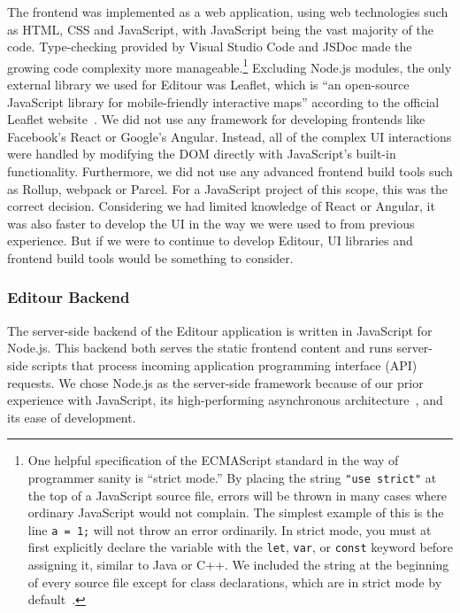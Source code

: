 \documentclass[a4paper, 10pt, american, titlepage]{article}
\begin{document}
The frontend was implemented as a web application, using web technologies such
as HTML, CSS and JavaScript, with JavaScript being the vast majority of the
code. Type-checking provided by Visual Studio Code and JSDoc made the growing
code complexity more manageable.\footnote{One helpful specification of the
ECMAScript standard in the way of programmer sanity is ``strict mode.'' By
placing the string \texttt{"use strict"} at the top of a JavaScript source file,
errors will be thrown in many cases where ordinary JavaScript would not
complain. The simplest example of this is the line \texttt{a = 1;} will not
throw an error ordinarily. In strict mode, you must at first explicitly declare
the variable with the \texttt{let}, \texttt{var}, or \texttt{const} keyword
before assigning it, similar to Java or C++. We included the string at the
beginning of every source file except for class declarations, which are in
strict mode by default~\autocite[386]{ecmainternational2019}.} Excluding Node.js
modules, the only external library we used for Editour was Leaflet, which is
``an open-source JavaScript library for mobile-friendly interactive maps''
according to the official Leaflet website~\autocite{leafletjs}. We did not use
any framework for developing frontends like Facebook's React or Google's
Angular. Instead, all of the complex UI interactions were handled by modifying
the DOM directly with JavaScript's built-in functionality. Furthermore, we did
not use any advanced frontend build tools such as Rollup, webpack or Parcel. For
a JavaScript project of this scope, this was the correct decision. Considering
we had limited knowledge of React or Angular, it was also faster to develop the
UI in the way we were used to from previous experience. But if we were to
continue to develop Editour, UI libraries and frontend build tools would be
something to consider.

\subsubsection{Editour Backend}
\label{sec:editourBackend}

The server-side backend of the Editour application is written in JavaScript for
Node.js. This backend both serves the static frontend content and runs
server-side scripts that process incoming application programming interface
(API) requests. We chose Node.js as the server-side framework because of our
prior experience with JavaScript, its high-performing asynchronous
architecture~\autocite{orsini2013}, and its ease of development.
\end{document}
